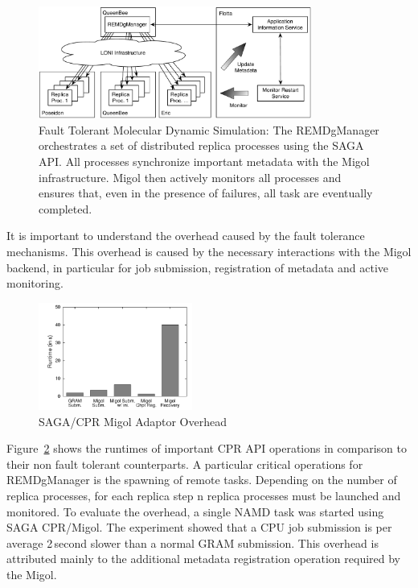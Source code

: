 \documentclass[times, 10pt,twocolumn]{article}
\begin{document}
\begin{figure}[t]
    \centering
        \includegraphics[width=0.8\textwidth]{saga-taskfarming}
        \caption{Fault Tolerant Molecular Dynamic Simulation: The
          REMDgManager orchestrates a set of distributed replica
          processes using the SAGA API. All processes synchronize
          important metadata with the Migol infrastructure. Migol then
          actively monitors all processes and ensures that, even in
          the presence of failures, all task are eventually
          completed.}
    \label{fig:saga-taskfarming}
\end{figure} 

It is important to understand the overhead caused by the fault
tolerance mechanisms. This overhead is caused by the necessary
interactions with the Migol backend, in particular for job submission,
registration of metadata and active monitoring.
\begin{figure}[ht]
    \centering
        \includegraphics[width=0.45\textwidth]{performance/perf_submission.pdf}
    \caption{SAGA/CPR Migol Adaptor Overhead}
    \label{fig:performance_perf_submission}
\end{figure}           
Figure~\ref{fig:performance_perf_submission} shows the runtimes of
important CPR API operations in comparison to their non fault tolerant
counterparts. A particular critical operations for REMDgManager is the
spawning of remote tasks. Depending on the number of replica
processes, for each replica step n replica processes must be launched
and monitored.  To evaluate the overhead, a single NAMD task was
started using SAGA CPR/Migol.  The experiment showed that a CPU job
submission is per average 2\,second slower than a normal GRAM
submission. This overhead is attributed mainly to the additional
metadata registration operation required by the Migol.
\end{document}
